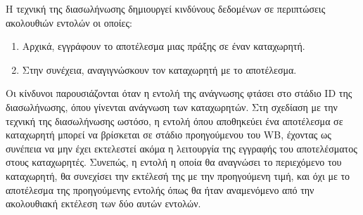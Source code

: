 \documentclass[11pt]{extarticle}
\begin{document}
Η τεχνική της διασωλήνωσης δημιουργεί κινδύνους δεδομένων σε περιπτώσεις ακολουθιών εντολών οι οποίες:
\begin{enumerate}
    \item Αρχικά, εγγράφουν το αποτέλεσμα μιας πράξης σε έναν καταχωρητή.
    \item Στην συνέχεια, αναγιγνώσκουν τον καταχωρητή με το αποτέλεσμα.
\end{enumerate}

Οι κίνδυνοι παρουσιάζονται όταν η εντολή της ανάγνωσης φτάσει στο στάδιο ID της διασωλήνωσης, όπου γίνενται ανάγνωση των καταχωρητών.
Στη σχεδίαση με την τεχνική της διασωλήνωσης ωστόσο, η εντολή όπου αποθηκεύει ένα αποτέλεσμα σε καταχωρητή μπορεί να βρίσκεται σε στάδιο προηγούμενου του WB, έχοντας ως συνέπεια να μην έχει εκτελεστεί ακόμα η λειτουργία της εγγραφής του αποτελέσματος στους καταχωρητές.
Συνεπώς, η εντολή η οποία θα αναγνώσει το περιεχόμενο του καταχωρητή, θα συνεχίσει την εκτέλεσή της με την προηγούμενη τιμή, και όχι με το αποτέλεσμα της προηγούμενης εντολής όπως θα ήταν αναμενόμενο από την ακολουθιακή εκτέλεση των δύο αυτών εντολών. \newline
\end{document}
